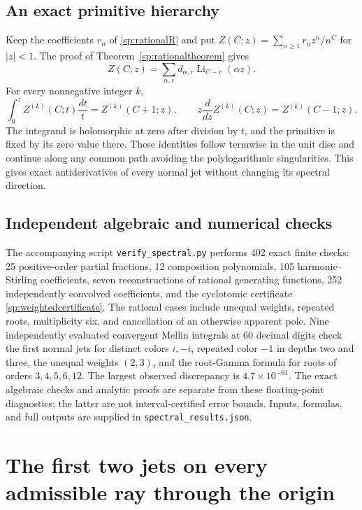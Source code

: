 \documentclass[11pt,a4paper]{article}
\theoremstyle{definition}
\theoremstyle{remark}
\numberwithin{equation}{section}
\begin{document}
\subsection{An exact primitive hierarchy}

Keep the coefficients $r_n$ of \eqref{sp:rationalR} and put
$Z(C;z)=\sum_{n\geq1}r_n z^n/n^C$ for $|z|<1$.
The proof of Theorem~\ref{sp:rationaltheorem} gives
\[
 Z(C;z)=\sum_{\alpha,r}d_{\alpha,r}
                    \operatorname{Li}_{C-r}(\alpha z).
\]
For every nonnegative integer $k$,
\begin{equation}\label{sp:primitive}
 \int_0^z Z^{(k)}(C;t)\frac{dt}{t}=Z^{(k)}(C+1;z),
 \qquad
 z\frac{d}{dz}Z^{(k)}(C;z)=Z^{(k)}(C-1;z).
\end{equation}
The integrand is holomorphic at zero after division by $t$, and the
primitive is fixed by its zero value there.  These identities follow
termwise in the unit disc and continue along any common path avoiding
the polylogarithmic singularities.  This gives exact antiderivatives
of every normal jet without changing its spectral direction.

\subsection{Independent algebraic and numerical checks}

The accompanying script \texttt{verify\_spectral.py} performs 402
exact finite checks: 25 positive-order partial fractions, 12
composition polynomials, 105 harmonic--Stirling coefficients, seven
reconstructions of rational generating functions, 252 independently
convolved coefficients, and the cyclotomic certificate
\eqref{sp:weightedcertificate}.  The rational cases include unequal
weights, repeated roots, multiplicity six, and cancellation of an
otherwise apparent pole.  Nine independently evaluated convergent
Mellin integrals at 60 decimal digits check the first normal jets for
distinct colors $i,-i$, repeated color $-1$ in depths two and three,
the unequal weights $(2,3)$, and the root-Gamma formula for roots of
orders $3,4,5,6,12$.  The largest observed discrepancy is
$4.7\times10^{-61}$.  The exact algebraic checks and analytic proofs
are separate from these floating-point diagnostics; the latter are
not interval-certified error bounds.  Inputs, formulas, and full
outputs are supplied in \texttt{spectral\_results.json}.


\section{The first two jets on every admissible ray through the origin}
\label{sp:sec:rays}
\end{document}
